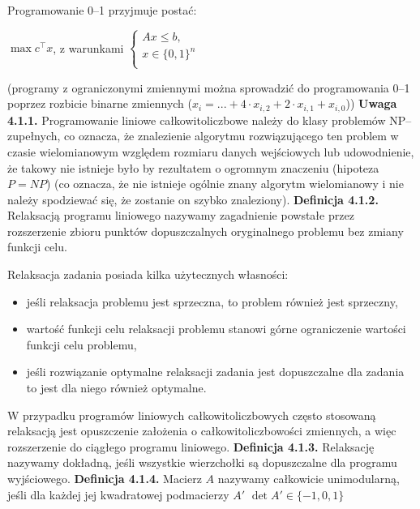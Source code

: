 \documentclass[licencjacka]{pracamgr}
\begin{document}
Programowanie 0--1 przyjmuje postać:\newline
\centerline{$
\max c^{\top}x$, z warunkami $\left\{\begin{array}{c}
Ax\le b,\\
x\in\{0,1\}^{n}\\
\end{array}\right.
$}\newline
(programy z ograniczonymi zmiennymi można sprowadzić do programowania 0--1 poprzez rozbicie binarne zmiennych ($x_i=...+4\cdot x_{i,2}+2\cdot x_{i,1}+x_{i,0}$))\newline\newline
%
\textbf{Uwaga 4.1.1.} Programowanie liniowe całkowitoliczbowe należy do klasy problemów NP--zupełnych, co oznacza, że znalezienie algorytmu rozwiązującego ten problem w czasie wielomianowym
względem rozmiaru danych wejściowych lub udowodnienie, że takowy nie istnieje było by rezultatem o ogromnym znaczeniu (hipoteza $P=NP$)
(co oznacza, że nie istnieje ogólnie znany algorytm wielomianowy i nie należy spodziewać się, że zostanie on szybko znaleziony).\newline\newline
\textbf{Definicja 4.1.2.} Relaksacją programu liniowego nazywamy zagadnienie powstałe przez rozszerzenie zbioru punktów dopuszczalnych oryginalnego problemu bez zmiany funkcji celu.\newline

Relaksacja zadania posiada kilka użytecznych własności:
\begin{itemize}\itemsep1pt \parskip0pt 
\item jeśli relaksacja problemu jest sprzeczna, to problem również jest sprzeczny,
\item wartość funkcji celu relaksacji problemu stanowi górne ograniczenie wartości funkcji celu problemu,
\item jeśli rozwiązanie optymalne relaksacji zadania jest dopuszczalne dla zadania to jest dla niego również optymalne.
\end{itemize}

W przypadku programów liniowych całkowitoliczbowych często stosowaną relaksacją jest opuszczenie założenia o całkowitoliczbowości zmiennych,
a więc rozszerzenie do ciągłego programu liniowego.\newline\newline
%
\textbf{Definicja 4.1.3.} Relaksację nazywamy dokładną, jeśli wszystkie wierzchołki są dopuszczalne dla programu wyjściowego.\newline\newline
\textbf{Definicja 4.1.4.} Macierz $A$ nazywamy całkowicie unimodularną, jeśli dla każdej jej kwadratowej podmacierzy $A'$ $\det{A'}\in\{-1,0,1\}$
%
\end{document}

